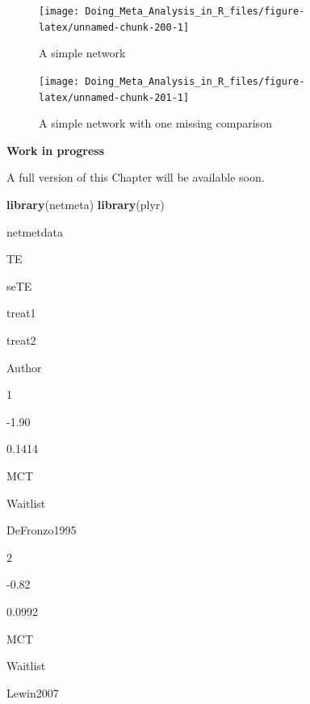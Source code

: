 \documentclass[]{book}
\newenvironment{Shaded}{\begin{snugshade}}{\end{snugshade}}
\newcommand{\KeywordTok}[1]{\textcolor[rgb]{0.13,0.29,0.53}{\textbf{#1}}}
\newcommand{\NormalTok}[1]{#1}
\begin{document}
\begin{figure}

{\centering \texttt{[image: Doing\_Meta\_Analysis\_in\_R\_files/figure-latex/unnamed-chunk-200-1]} 

}

\caption{A simple network}\label{fig:unnamed-chunk-200}
\end{figure}

\begin{figure}

{\centering \texttt{[image: Doing\_Meta\_Analysis\_in\_R\_files/figure-latex/unnamed-chunk-201-1]} 

}

\caption{A simple network with one missing comparison}\label{fig:unnamed-chunk-201}
\end{figure}

\begin{rmdinfo}
\textbf{Work in progress}

A full version of this Chapter will be available soon.
\end{rmdinfo}

\begin{Shaded}
\begin{Highlighting}[]
\KeywordTok{library}\NormalTok{(netmeta)}
\KeywordTok{library}\NormalTok{(plyr)}
\end{Highlighting}
\end{Shaded}

\begin{Shaded}
\begin{Highlighting}[]
\NormalTok{netmetdata}
\end{Highlighting}
\end{Shaded}

TE

seTE

treat1

treat2

Author

1

-1.90

0.1414

MCT

Waitlist

DeFronzo1995

2

-0.82

0.0992

MCT

Waitlist

Lewin2007
\end{document}
